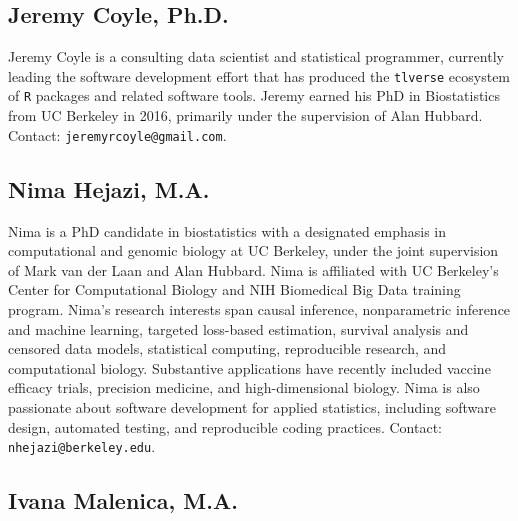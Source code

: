 \documentclass[a4paper,11pt]{texMemo}
\begin{document}
\vspace{-.5em}

\subsection*{Jeremy Coyle, Ph.D.}

\vspace{-.5em}

Jeremy Coyle is a consulting data scientist and statistical programmer, currently leading the software development effort that has produced the
\texttt{tlverse} ecosystem of \texttt{R} packages and related software tools. Jeremy earned his PhD in Biostatistics from UC Berkeley in 2016, primarily under the supervision of Alan Hubbard. Contact: \texttt{jeremyrcoyle@gmail.com}.

\vspace{-.5em}

\subsection*{Nima Hejazi, M.A.}

\vspace{-.5em}

Nima is a PhD candidate in biostatistics with a designated emphasis in computational and genomic biology at UC Berkeley, under the joint supervision of Mark van der Laan and Alan Hubbard. Nima is affiliated with UC Berkeley's Center for Computational Biology and NIH Biomedical Big Data training program. Nima's research interests span causal inference, nonparametric inference and machine
learning, targeted loss-based estimation, survival analysis and censored data models, statistical computing, reproducible research, and computational
biology. Substantive applications have recently included vaccine efficacy trials, precision medicine, and high-dimensional biology. Nima is also
passionate about software development for applied statistics, including software design, automated testing, and reproducible coding practices. Contact:
\texttt{nhejazi@berkeley.edu}.

\vspace{-.5em}

\subsection*{Ivana Malenica, M.A.}

\vspace{-.5em}
\end{document}
